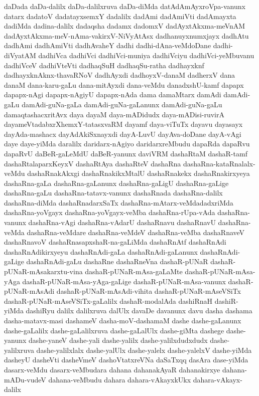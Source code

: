 {daDada
daDa-dalilx
daDa-dalilxruva
daDa-diMda
datAdAmAyxroVpa-vanunx
datarx
dadatoV
dadatayxsemxY
dadalilx
dadAmi
dadAmiVti
dadAmayxta
dadiMda
dadina-dalilx
dadaqsha
dadamx
dadomxV
dadAyxtAkxma-meVnAM
dadAyxtAkxma-meV-nAma-vakirxV-NiVyAtAsx
dadhanuyxnumxjayx
dadhAtu
dadhAmi
dadhAmiVti
dadhAvaheY
dadhi
dadhi-dAna-veMdoDane
dadhi-diVyatAM
dadhiVca
dadhiVci
dadhiVci-muniya
dadhiVciyu
dadhiVci-yeMbuvanu
dadhiVceV
dadhiVteVti
dadhaqSuH
dadhaqSu-ratha
dadhayxknf
dadhayxknAknx-thavaRNoV
dadhAyxdi
dadhoyxV-danaM
dadherxV
dana
danaM
dana-karu-gaLu
dana-mitAyxdi
dana-veMdu
danadxshU-kamf
dapapx
dapapx-nAgi
dapapx-nAgiyU
dapapx-nAda
dama
damaMtarx
damAdi
damAdi-gaLu
damAdi-guNa-gaLa
damAdi-guNa-gaLanunx
damAdi-guNa-gaLu
damaqtashacxritAvx
daya
dayaM
daya-mADidudx
daya-mADisi-ruvirA
dayameVtadabxrXhemxY-tatasxvaRM
dayamf
daya-viTuTx
dayavu
dayasayx
dayAda-mashacx
dayAdAkiSxnayxdi
dayA-LuvU
dayAva-doDane
dayA-vAgi
daye
daye-yiMda
daralilx
daridarx-nAgiyo
daridarxreMbudu
dapaRda
dapaRvu
dapaRvU
daBeR-gaLeMdU
daBeR-yanunx
daviVRM
dashaRtaM
dashaR-tamf
dashaRtalaparxKeyxV
dashaRtAya
dashaRteV
dashaRna
dashaRna-kataRnalalx-veMdu
dashaRnakAkxgi
dashaRnakikxMtalU
dashaRnakekx
dashaRnakirxyeya
dashaRna-gaLa
dashaRna-gaLanunx
dashaRna-gaLigU
dashaRna-gaLige
dashaRna-gaLu
dashaRna-tatavx-vanunx
dashaRnada
dashaRna-dalilx
dashaRna-diMda
dashaRnadarxSaTx
dashaRna-mAtarx-veMdadadxriMda
dashaRna-yoVgayx
dashaRna-yoVgayx-veMba
dashaRna-rUpa-vAda
dashaRna-vanunx
dashaRna-vAgi
dashaRna-vAdarU
dashaRnavu
dashaRnavU
dashaRna-veMda
dashaRna-veMdare
dashaRna-veMdeV
dashaRna-veMba
dashaRnaveV
dashaRnavoV
dashaRnasapxshaR-na-gaLiMda
dashaRnAtf
dashaRnAdi
dashaRnAdikirxyeyu
dashaRnAdi-gaLa
dashaRnAdi-gaLanunx
dashaRnAdi-gaLige
dashaRnAdi-gaLu
dashaRne
dashaRneVna
dashaR-pUNaR
dashaR-pUNaR-mAsakarxtu-vina
dashaR-pUNaR-mAsa-gaLaMte
dashaR-pUNaR-mAsa-yAga
dashaR-pUNaR-mAsa-yAga-gaLige
dashaR-pUNaR-mAsa-vanunx
dashaR-pUNaR-mAsAdi
dashaR-pUNaR-mAsAdi-vihita
dashaR-pUNaR-mAseVSiTx
dashaR-pUNaR-mAseVSiTx-gaLalilx
dashaR-modalAda
dashiRnaH
dashiR-yiMda
dashiRyu
dalilx
dalilxruva
dalUlx
davaDe
davanunx
davu
dasha
dashama
dasha-matavx-masi
dashameV
dasha-moV-dashamaM
dashe
dashe-gaLanunx
dashe-gaLalilx
dashe-gaLalilxruva
dashe-gaLalUlx
dashe-giMta
dashege
dashe-yanunx
dashe-yaneV
dashe-yali
dashe-yalilx
dashe-yalilxdudxdudx
dashe-yalilxruva
dashe-yalilxlalx
dashe-yalUlx
dashe-yalelx
dashe-yalelxV
dashe-yiMda
dasheyU
dasheVti
dasheVmeV
dashoVtatxreVNa
daSaTxqq
dasAra
dase-yiMda
dasarx-veMdu
dasarx-veMbudara
dahana
dahanakAyaR
dahanakirxye
dahana-mADu-vudeV
dahana-veMbudu
dahara
dahara-vAkayxkUkx
dahara-vAkayx-dalilx
}
